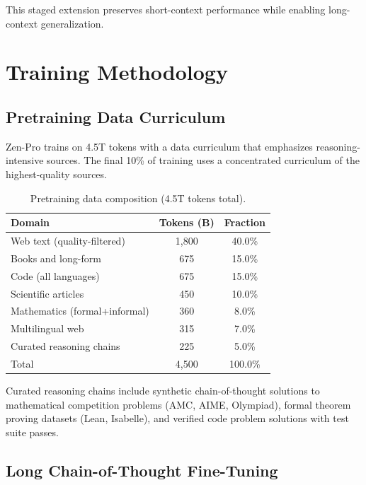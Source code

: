 \documentclass[11pt,a4paper]{article}
\begin{document}
This staged extension preserves short-context performance while enabling long-context
generalization.

\section{Training Methodology}

\subsection{Pretraining Data Curriculum}

Zen-Pro trains on 4.5T tokens with a data curriculum that emphasizes reasoning-intensive sources.
The final 10\% of training uses a concentrated curriculum of the highest-quality sources.

\begin{table}[H]
\centering
\caption{Pretraining data composition (4.5T tokens total).}
\label{tab:data}
\begin{tabular}{lcc}
\toprule
\textbf{Domain} & \textbf{Tokens (B)} & \textbf{Fraction} \\
\midrule
Web text (quality-filtered) & 1{,}800 & 40.0\% \\
Books and long-form         &   675 & 15.0\% \\
Code (all languages)        &   675 & 15.0\% \\
Scientific articles         &   450 & 10.0\% \\
Mathematics (formal+informal) & 360 &  8.0\% \\
Multilingual web            &   315 &  7.0\% \\
Curated reasoning chains    &   225 &  5.0\% \\
\midrule
Total                       & 4{,}500 & 100.0\% \\
\bottomrule
\end{tabular}
\end{table}

Curated reasoning chains include synthetic chain-of-thought solutions to mathematical competition
problems (AMC, AIME, Olympiad), formal theorem proving datasets (Lean, Isabelle), and
verified code problem solutions with test suite passes.

\subsection{Long Chain-of-Thought Fine-Tuning}
\end{document}
